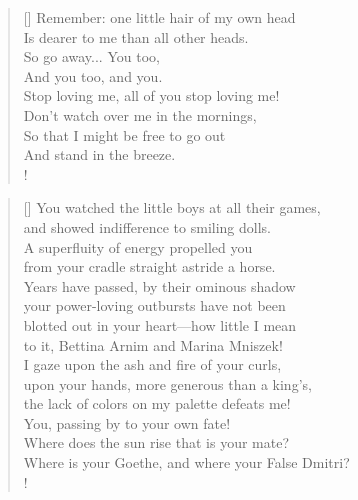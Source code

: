 \documentclass[]{article}
\newcommand{\poemauthorcenter}[1]{\nopagebreak{\centering\footnotesize\textsc{#1}\par}}
\begin{document}
\settowidth{\versewidth}{Remember: one little hair of my own head }
\begin{verse}[\versewidth]
Remember: one little hair of my own head\\
Is dearer to me than all other heads.\\
So go away... You too,\\
And you too, and you.\\
Stop loving me, all of you stop loving me!\\
Don't watch over me in the mornings,\\
So that I might be free to go out\\
And stand in the breeze.\\!
\end{verse}
\bigskip \bigskip 

\settowidth{\versewidth}{You watched the little boys at all their games,  }
\begin{verse}[\versewidth]
You watched the little boys at all their games,\\
and showed indifference to smiling dolls.\\
A superfluity of energy propelled you\\
from your cradle straight astride a horse.\\
Years have passed, by their ominous shadow\\
your power-loving outbursts have not been\\
blotted out in your heart—how little I mean\\
to it, Bettina Arnim and Marina Mniszek!\\
I gaze upon the ash and fire of your curls,\\
upon your hands, more generous than a king's,\\
the lack of colors on my palette defeats me!\\
You, passing by to your own fate!\\
Where does the sun rise that is your mate?\\
Where is your Goethe, and where your False Dmitri?\\!
\end{verse}
\poemauthorcenter{\textit{May 9th, 1915}}
\bigskip \bigskip
\end{document}
